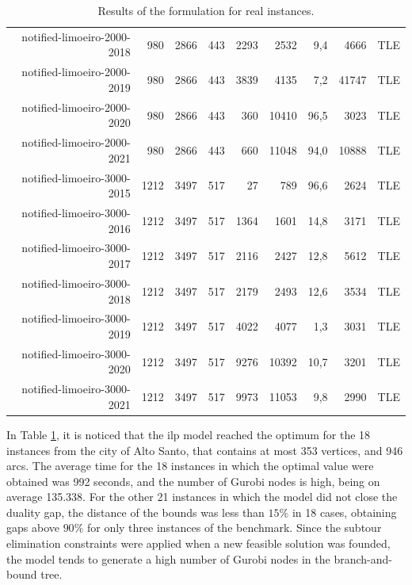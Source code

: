 \documentclass[a4paper,11pt]{article}
\begin{document}
\begin{table}[!ht]
{\begin{tabular}{rrrrrrrrr}
\rowcolor[HTML]{C0C0C0} 
notified-limoeiro-2000-2018   & 980  & 2866 & 443 & 2293 & 2532  & 9,4  & 4666   & TLE    \\
\rowcolor[HTML]{C0C0C0} 
notified-limoeiro-2000-2019   & 980  & 2866 & 443 & 3839 & 4135  & 7,2  & 41747  & TLE    \\
\rowcolor[HTML]{C0C0C0} 
notified-limoeiro-2000-2020   & 980  & 2866 & 443 & 360  & 10410 & 96,5 & 3023   & TLE    \\
\rowcolor[HTML]{C0C0C0} 
notified-limoeiro-2000-2021   & 980  & 2866 & 443 & 660  & 11048 & 94,0 & 10888  & TLE    \\ \hline
\rowcolor[HTML]{C0C0C0} 
notified-limoeiro-3000-2015   & 1212 & 3497 & 517 & 27   & 789   & 96,6 & 2624   & TLE    \\
\rowcolor[HTML]{C0C0C0} 
notified-limoeiro-3000-2016   & 1212 & 3497 & 517 & 1364 & 1601  & 14,8 & 3171   & TLE    \\
\rowcolor[HTML]{C0C0C0} 
notified-limoeiro-3000-2017   & 1212 & 3497 & 517 & 2116 & 2427  & 12,8 & 5612   & TLE    \\
\rowcolor[HTML]{C0C0C0} 
notified-limoeiro-3000-2018   & 1212 & 3497 & 517 & 2179 & 2493  & 12,6 & 3534   & TLE    \\
\rowcolor[HTML]{C0C0C0} 
notified-limoeiro-3000-2019   & 1212 & 3497 & 517 & 4022 & 4077  & 1,3  & 3031   & TLE    \\
\rowcolor[HTML]{C0C0C0} 
notified-limoeiro-3000-2020   & 1212 & 3497 & 517 & 9276 & 10392 & 10,7 & 3201   & TLE    \\
\rowcolor[HTML]{C0C0C0} 
notified-limoeiro-3000-2021   & 1212 & 3497 & 517 & 9973 & 11053 & 9,8  & 2990   & TLE    \\ \hline
\end{tabular}%
}
\caption{Results of the formulation for real instances.}
\label{tab:model-results}
\end{table}

In Table \ref{tab:model-results}, it is noticed that the \gls{ilp} model reached
the optimum for the  18 instances from the city of Alto  Santo, that contains at
most 353 vertices, and 946 arcs. The average time for the 18 instances in which
the optimal value were obtained was 992  seconds, and the number of Gurobi nodes
is high, being on average 135.338. For the other 21 instances in which the model
did not close the  duality gap, the distance of the bounds  was less than $15\%$
in  18 cases,  obtaining  gaps above  $90\%$  for only  three  instances of  the
benchmark. Since  the subtour  elimination constraints were  applied when  a new
feasible solution  was founded,  the model  tends to generate  a high  number of
Gurobi nodes in the branch-and-bound tree.
\end{document}
